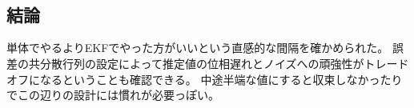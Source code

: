 \documentclass[10pt,dvipdfmx,fleqn]{jarticle}
\begin{document}
    \begin{center}
    \end{center}
    { \hspace*{\fill} \\}
    
    \begin{center}
    \end{center}
    { \hspace*{\fill} \\}
    
    \subsection{結論}\label{ux7d50ux8ad6}

単体でやるよりEKFでやった方がいいという直感的な間隔を確かめられた。
誤差の共分散行列の設定によって推定値の位相遅れとノイズへの頑強性がトレードオフになるということも確認できる。
中途半端な値にすると収束しなかったりでこの辺りの設計には慣れが必要っぽい。


    
    
    
    
\end{document}
